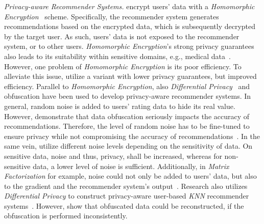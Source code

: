 \documentclass[manuscript,review,anonymous]{acmart}
\begin{document}
\vspace{2mm} \noindent \emph{Privacy-aware Recommender Systems.}
\cite{badsha2017privacy} encrypt users' data with a \emph{Homomorphic Encryption}~\cite{gentry2009fully} scheme.
Specifically, the recommender system generates recommendations based on the encrypted data, which is subsequently decrypted by the target user.
As such, users' data is not exposed to the recommender system, or to other users.
\emph{Homomorphic Encryption}'s strong privacy guarantees also leads to its suitability within sensitive domains, e.g., medical data~\cite{zhang2021privacy}.
However, one problem of \emph{Homomorphic Encryption} is its poor efficiency.
To alleviate this issue, \cite{tang2016privacy,kikuchi2012accuracy} utilize a variant with lower privacy guarantees, but improved efficiency.
Parallel to \emph{Homomorphic Encryption}, also \emph{Differential Privacy}~\cite{dwork2014algorithmic} and obfuscation have been used to develop privacy-aware recommender systems.
In general, random noise is added to users' rating data to hide its real value.
However, \cite{berkovsky2012impact} demonstrate that data obfuscation seriously impacts the accuracy of recommendations.
Therefore, the level of random noise has to be fine-tuned to ensure privacy while not compromising the accuracy of recommendations~\cite{mcsherry2009differentially}.
In the same vein, \cite{meng2018personalized} utilize different noise levels depending on the sensitivity of data.
On sensitive data, noise and thus, privacy, shall be increased, whereas for non-sensitive data, a lower level of noise is sufficient.
Additionally, in \emph{Matrix Factorization} for example, noise could not only be added to users' data, but also to the gradient and the recommender system's output~\cite{berlioz2015applying}.
Research also utilizes \emph{Differential Privacy} to construct privacy-aware user-based \emph{KNN} recommender systems~\cite{lu2015security,zhu2014effective}.
However, \cite{okkalioglu2016reconstructing} show that obfuscated data could be reconstructed, if the obfuscation is performed inconsistently.
\end{document}
